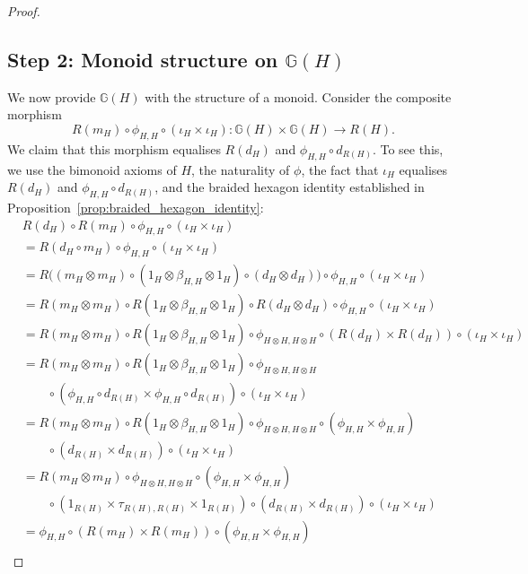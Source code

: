 \documentclass{amsart}
\begin{document}
\begin{proof}
\subsection*{Step 2: Monoid structure on $\mathbb{G}(H)$}

We now provide $\mathbb{G}(H)$ with the structure of a monoid. Consider the composite morphism
\[
R(m_H) \circ \phi_{H,H} \circ (\iota_H \times \iota_H) \colon \mathbb{G}(H) \times \mathbb{G}(H) \longrightarrow R(H).
\]
We claim that this morphism equalises $R(d_H)$ and $\phi_{H,H} \circ d_{R(H)}$. To see this, we use the bimonoid axioms of $H$, the naturality of $\phi$, the fact that $\iota_H$ equalises $R(d_H)$ and $\phi_{H,H} \circ d_{R(H)}$, and the braided hexagon identity established in Proposition~\ref{prop:braided_hexagon_identity}:
\begin{align*}
&R(d_H) \circ R(m_H) \circ \phi_{H,H} \circ (\iota_H \times \iota_H) \\
&= R(d_H \circ m_H) \circ \phi_{H,H} \circ (\iota_H \times \iota_H) \\
&= R\bigl((m_H \otimes m_H) \circ (1_H \otimes \beta_{H,H} \otimes 1_H) \circ (d_H \otimes d_H)\bigr) \circ \phi_{H,H} \circ (\iota_H \times \iota_H) \\
&= R(m_H \otimes m_H) \circ R(1_H \otimes \beta_{H,H} \otimes 1_H) \circ R(d_H \otimes d_H) \circ \phi_{H,H} \circ (\iota_H \times \iota_H) \\
&= R(m_H \otimes m_H) \circ R(1_H \otimes \beta_{H,H} \otimes 1_H) \circ \phi_{H\otimes H, H\otimes H} \circ (R(d_H) \times R(d_H)) \circ (\iota_H \times \iota_H) \\
&= R(m_H \otimes m_H) \circ R(1_H \otimes \beta_{H,H} \otimes 1_H) \circ \phi_{H\otimes H, H\otimes H} \\
&\qquad \circ (\phi_{H,H} \circ d_{R(H)} \times \phi_{H,H} \circ d_{R(H)}) \circ (\iota_H \times \iota_H) \\
&= R(m_H \otimes m_H) \circ R(1_H \otimes \beta_{H,H} \otimes 1_H) \circ \phi_{H\otimes H, H\otimes H} \circ (\phi_{H,H} \times \phi_{H,H}) \\
&\qquad \circ (d_{R(H)} \times d_{R(H)}) \circ (\iota_H \times \iota_H) \\
&= R(m_H \otimes m_H) \circ \phi_{H\otimes H, H\otimes H} \circ (\phi_{H,H} \times \phi_{H,H}) \\
&\qquad \circ (1_{R(H)} \times \tau_{R(H),R(H)} \times 1_{R(H)}) \circ (d_{R(H)} \times d_{R(H)}) \circ (\iota_H \times \iota_H) \\
&= \phi_{H,H} \circ (R(m_H) \times R(m_H)) \circ (\phi_{H,H} \times \phi_{H,H}) \\

\end{align*}
\end{proof}
\end{document}
